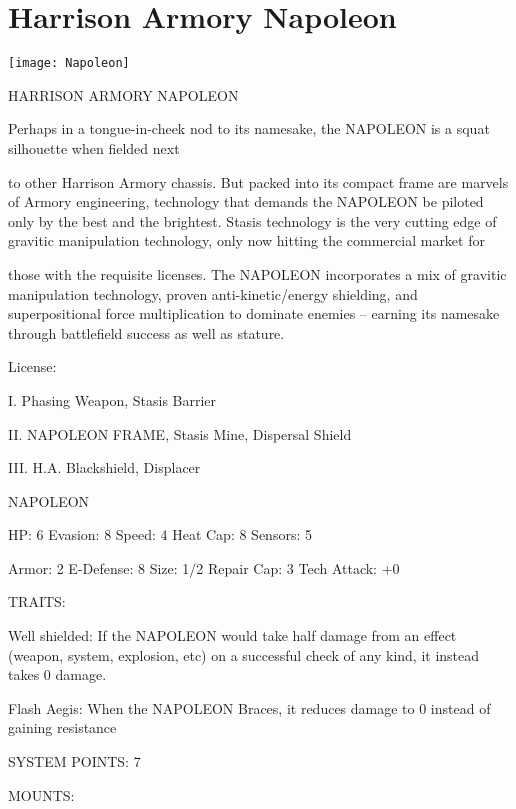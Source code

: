 \section{Harrison Armory Napoleon}

\centering\texttt{[image: Napoleon]}

                             HARRISON ARMORY NAPOLEON

Perhaps in a tongue-in-cheek nod to its namesake, the NAPOLEON is a squat silhouette when fielded next

to other Harrison Armory chassis. But packed into its compact frame are marvels of Armory engineering,
technology that demands the NAPOLEON be piloted only by the best and the brightest. Stasis technology
is the very cutting edge of gravitic manipulation technology, only now hitting the commercial market for

those with the requisite licenses. The NAPOLEON incorporates a mix of gravitic manipulation technology,
proven anti-kinetic/energy shielding, and superpositional force multiplication to dominate enemies --
earning its namesake through battlefield success as well as stature.

                                                  License:

I. Phasing Weapon, Stasis Barrier

II. NAPOLEON FRAME, Stasis Mine, Dispersal Shield

III. H.A. Blackshield, Displacer


                                               NAPOLEON

 HP: 6          Evasion: 8                           Speed: 4           Heat Cap: 8       Sensors:  5

 Armor: 2       E-Defense: 8                         Size: 1/2          Repair Cap: 3     Tech Attack:
                                                                                          +0

                                                  TRAITS:

 Well shielded: If the NAPOLEON would take half damage from an effect (weapon, system, explosion,
 etc) on a successful check of any kind, it instead takes 0 damage.

 Flash Aegis: When the NAPOLEON Braces, it reduces damage to 0 instead of gaining resistance

                                            SYSTEM POINTS: 7

                                                 MOUNTS:

